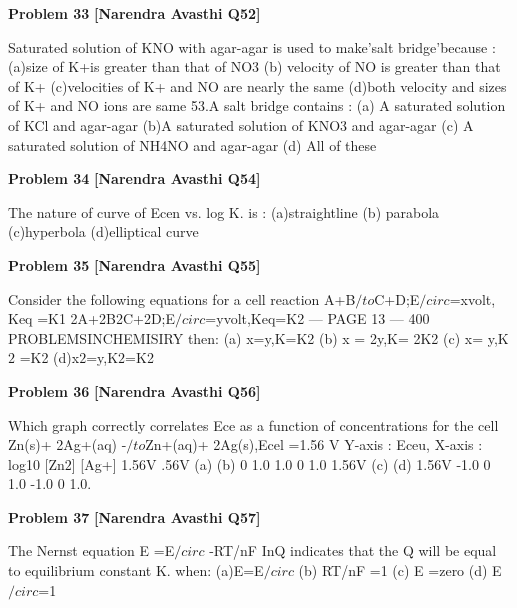 \begin{problembox}
\textbf{Problem 33} \hfill \textbf{[Narendra Avasthi Q52]}
\label{q:ext-narendra_avasthi_all_questions-33}

Saturated solution of KNO with agar-agar is used to make'salt bridge'because :
(a)size of K+is greater than that of NO3
(b) velocity of NO is greater than that of K+
(c)velocities of K+ and NO are nearly the same
(d)both velocity and sizes of K+ and NO ions are same
53.A salt bridge contains :
(a) A saturated solution of KCl and agar-agar
(b)A saturated solution of KNO3 and agar-agar
(c) A saturated solution of NH4NO and agar-agar
(d) All of these
\end{problembox}

\begin{problembox}
\textbf{Problem 34} \hfill \textbf{[Narendra Avasthi Q54]}
\label{q:ext-narendra_avasthi_all_questions-34}

The nature of curve of Ecen vs. log K.  is :
(a)straightline
(b) parabola
(c)hyperbola
(d)elliptical curve
\end{problembox}

\begin{problembox}
\textbf{Problem 35} \hfill \textbf{[Narendra Avasthi Q55]}
\label{q:ext-narendra_avasthi_all_questions-35}

Consider the following equations for a cell reaction
A+B$/to$C+D;E$/circ$=xvolt, Keq =K1
2A+2B2C+2D;E$/circ$=yvolt,Keq=K2
--- PAGE 13 ---
400
PROBLEMSINCHEMISIRY
then:
(a) x=y,K=K2
(b) x = 2y,K= 2K2
(c) x= y,K$2$ =K2
(d)x$2$=y,K$2$=K2
\end{problembox}

\begin{problembox}
\textbf{Problem 36} \hfill \textbf{[Narendra Avasthi Q56]}
\label{q:ext-narendra_avasthi_all_questions-36}

Which graph correctly correlates Ece as a function of concentrations for the cell
Zn(s)+ 2Ag+(aq) -$/to$Zn+(aq)+ 2Ag(s),Ecel =1.56 V
Y-axis : Eceu, X-axis : log10 
[Zn$2$]
[Ag+]
1.56V
.56V
(a)
(b)
0
1.0
1.0
0
1.0
1.56V
(c)
(d)
1.56V
-1.0
0
1.0
-1.0
0
1.0.
\end{problembox}

\begin{problembox}
\textbf{Problem 37} \hfill \textbf{[Narendra Avasthi Q57]}
\label{q:ext-narendra_avasthi_all_questions-37}

The Nernst equation E =E$/circ$ -RT/nF InQ indicates that the Q will be equal to equilibrium
constant K. when:
(a)E=E$/circ$
(b) RT/nF =1
(c) E =zero
(d) E$/circ$=1
\end{problembox}

